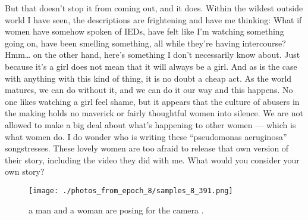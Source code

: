 \documentclass{article}%
\begin{document}
But that doesn’t stop it from coming out, and it does. Within the wildest outside world I have seen, the descriptions are frightening and have me thinking: What if women have somehow spoken of IEDs, have felt like I’m watching something going on, have been smelling something, all while they’re having intercourse? Hmm… on the other hand, here’s something I don’t necessarily know about. Just because it’s a girl does not mean that it will always be a girl.\newline%
And as is the case with anything with this kind of thing, it is no doubt a cheap act. As the world matures, we can do without it, and we can do it our way and this happens. No one likes watching a girl feel shame, but it appears that the culture of abusers in the making holds no maverick or fairly thoughtful women into silence. We are not allowed to make a big deal about what’s happening to other women — which is what women do.\newline%
I do wonder who is writing these “pseudomonas aeruginosa” songstresses. These lovely women are too afraid to release that own version of their story, including the video they did with me. What would you consider your own story?\newline%

%


\begin{figure}[h!]%
\centering%
\texttt{[image: ./photos\_from\_epoch\_8/samples\_8\_391.png]}%
\caption{a man and a woman are posing for the camera .}%
\end{figure}

%
\end{document}
